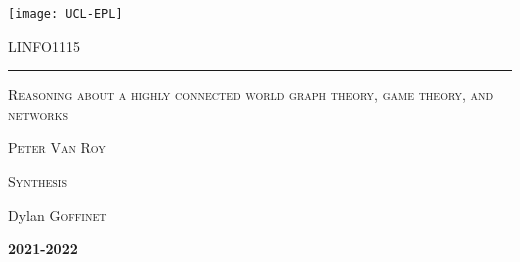 \documentclass{report}
\begin{document}

\begin{titlepage}
	\flushleft\texttt{[image: UCL-EPL]}\\
	\vspace*{2cm}
	\vspace*{\fill}
	\centering
	{\scshape\LARGE LINFO1115 \par}
	\vspace{0.4cm}
	{\color{clearBlue}\rule{0.7\textwidth}{1pt}\par}
	\vspace{0.5cm}
	{\scshape\Large Reasoning about a highly connected world graph theory, game theory, and networks \par}
	\vspace{0.5cm}
	{\scshape\large Peter Van Roy \par}
	\vspace{1cm}
	{\scshape\large Synthesis \par}
	{\Large\itshape\par}
	\vspace*{\fill}
	\vfill
	\vfill
	{\Large Dylan \textsc{Goffinet}\par}
	\vspace{0.5cm}
	{\Large\bfseries 2021-2022\par}
	{\large \par}
\end{titlepage}


\setcounter{tocdepth}{1} %
\tableofcontents
\clearpage




\end{document}
